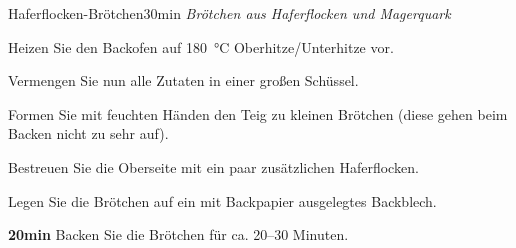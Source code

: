 \documentclass[../recipe-collections/cooking.tex]{subfiles}
\begin{document}
\begin{recipe}{Haferflocken-Brötchen}{}{30min }
  \freeform{}\textit{Brötchen aus Haferflocken und Magerquark}


  Heizen Sie den Backofen auf 180 °C Oberhitze/Unterhitze vor.

  \newstep{}Vermengen Sie nun alle Zutaten in einer großen Schüssel.

  \newstep{}Formen Sie mit feuchten Händen den Teig zu kleinen Brötchen (diese gehen beim Backen nicht zu sehr auf).

  \newstep{}Bestreuen Sie die Oberseite mit ein paar zusätzlichen Haferflocken.

  \newstep{}Legen Sie die Brötchen auf ein mit Backpapier ausgelegtes Backblech.

  \newstep{}\textbf{20min}
  Backen Sie die Brötchen für ca. 20–30 Minuten.

  \freeform{}\hrulefill{}

\end{recipe}
\end{document}
